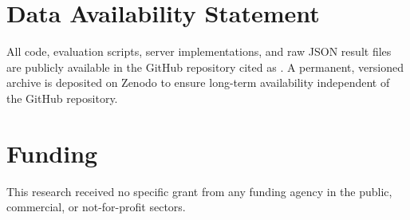 \documentclass[journal]{IEEEtran}
\theoremstyle{definition}
\begin{document}
\section*{Data Availability Statement}
All code, evaluation scripts, server implementations, and raw JSON
result files are publicly available in the GitHub repository cited as
\cite{nac_mcp_impl}. A permanent, versioned archive is deposited on
Zenodo to ensure long-term availability independent of the GitHub repository.

\section*{Funding}
This research received no specific grant from any funding agency in the public,
commercial, or not-for-profit sectors.

\balance
\end{document}
